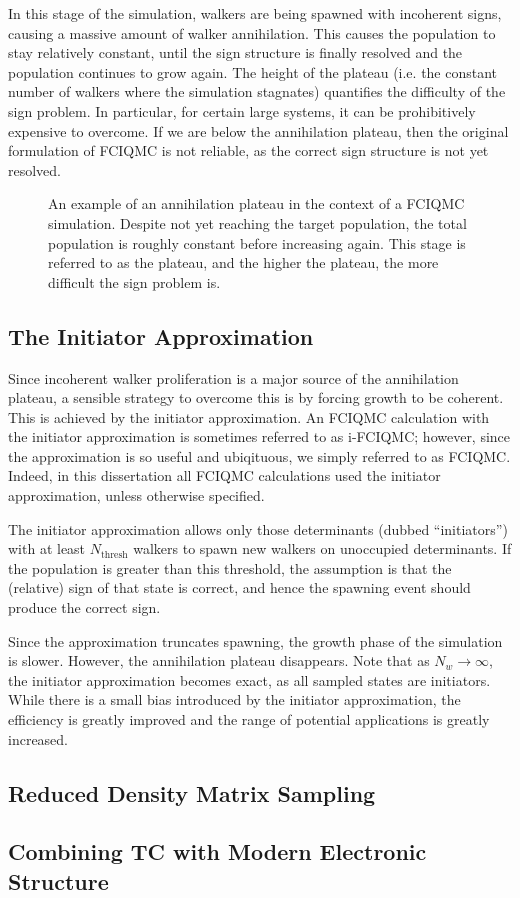 In this stage of the simulation, walkers are being spawned with incoherent signs, causing a massive amount of walker annihilation. This causes the population to stay relatively constant, until the sign structure is finally resolved and the population continues to grow again. The height of the plateau (i.e. the constant number of walkers where the simulation stagnates) quantifies the difficulty of the sign problem. In particular, for certain large systems, it can be prohibitively expensive to overcome. If we are below the annihilation plateau, then the original formulation of \gls{FCIQMC} is not reliable, as the correct sign structure is not yet resolved.

\begin{figure}[htbp]
    \centering
    \caption{An example of an annihilation plateau in the context of a \gls{FCIQMC} simulation. Despite not yet reaching the target population, the total population is roughly constant before increasing again. This stage is referred to as the plateau, and the higher the plateau, the more difficult the sign problem is. }
    \label{fig:annihilation_plateau}
\end{figure}

\subsection{The Initiator Approximation}

Since incoherent walker proliferation is a major source of the annihilation plateau, a sensible strategy to overcome this is by forcing growth to be coherent. This is achieved by the initiator approximation. An \gls{FCIQMC} calculation with the initiator approximation is sometimes referred to as i-FCIQMC; however, since the approximation is so useful and ubiqituous, we simply referred to as FCIQMC. Indeed, in this dissertation all FCIQMC calculations used the initiator approximation, unless otherwise specified.

The initiator approximation allows only those determinants (dubbed ``initiators'') with at least $N_\mathrm{thresh}$ walkers to spawn new walkers on unoccupied determinants. If the population is greater than this threshold, the assumption is that the (relative) sign of that state is correct, and hence the spawning event should produce the correct sign.

Since the approximation truncates spawning, the growth phase of the simulation is slower. However, the annihilation plateau disappears. Note that as $N_w\to\infty$, the initiator approximation becomes exact, as all sampled states are initiators. While there is a small bias introduced by the initiator approximation, the efficiency is greatly improved and the range of potential applications is greatly increased.

\subsection{Reduced Density Matrix Sampling}

\subsection{Combining TC with Modern Electronic Structure}
